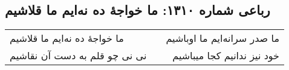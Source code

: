 \begin{center}
\section*{رباعی شماره ۱۳۱۰: ما خواجهٔ ده نه‌ایم ما قلاشیم}
\label{sec:1310}
\begin{longtable}{l p{0.5cm} r}
ما خواجهٔ ده نه‌ایم ما قلاشیم
&&
ما صدر سرانه‌ایم ما اوباشیم
\\
نی نی چو قلم به دست آن نقاشیم
&&
خود نیز ندانیم کجا میباشیم
\\
\end{longtable}
\end{center}
